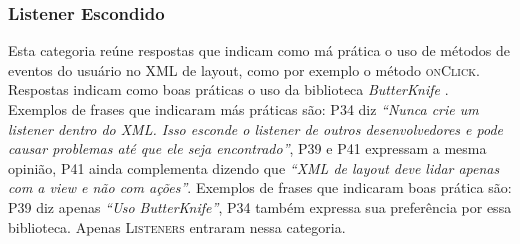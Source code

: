 \subsubsection{Listener Escondido}
Esta categoria re\'une respostas que indicam como m\'a pr\'atica o uso de m\'etodos de eventos do usu\'ario no XML de layout, como por exemplo o m\'etodo \textsc{onClick}. Respostas indicam como boas pr\'aticas o uso da biblioteca \textit{ButterKnife} \cite{ButterKnife}. Exemplos de frases que indicaram m\'as pr\'aticas s\~ao: P34 diz \textit{``Nunca crie um listener dentro do XML. Isso esconde o listener de outros desenvolvedores e pode causar problemas at\'e que ele seja encontrado''}, P39 e P41 expressam a mesma opini\~ao, P41 ainda complementa dizendo que \textit{``XML de layout deve lidar apenas com a view e n\~ao com a\c{c}\~oes''}. Exemplos de frases que indicaram boas pr\'atica s\~ao: P39 diz apenas \textit{``Uso ButterKnife''}, P34 tamb\'em expressa sua prefer\^encia por essa biblioteca. Apenas \textsc{Listeners} entraram nessa categoria.










